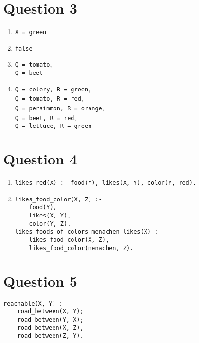 \documentclass[13pt]{article}
\begin{document}
\newpage
\section*{Question 3}
\begin{enumerate}[label=(\alph*)]
\item \texttt{X = green}
\item \texttt{false}
\item \texttt{Q = tomato}, \\ \texttt{Q = beet}
\item \texttt{Q = celery, R = green}, \\
  \texttt{Q = tomato, R = red}, \\
  \texttt{Q = persimmon, R = orange}, \\
  \texttt{Q = beet, R = red}, \\
  \texttt{Q = lettuce, R = green} \\
\end{enumerate}


\newpage
\section*{Question 4}
\begin{enumerate}[label=(\alph*)]
\item \texttt{likes\_red(X) :- food(Y), likes(X, Y), color(Y, red).}
\item
\begin{verbatim}
likes_food_color(X, Z) :-
    food(Y),
    likes(X, Y),
    color(Y, Z).
likes_foods_of_colors_menachen_likes(X) :-
    likes_food_color(X, Z),
    likes_food_color(menachen, Z).
\end{verbatim}
\end{enumerate}


\newpage
\section*{Question 5}
\begin{verbatim}
reachable(X, Y) :-
    road_between(X, Y);
    road_between(Y, X);
    road_between(X, Z), 
    road_between(Z, Y).
\end{verbatim}


\newpage
\end{document}
